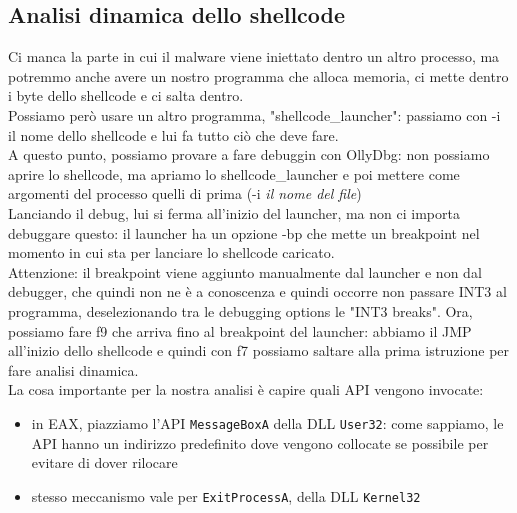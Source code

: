 \documentclass[12pt, oneside]{extbook}
\begin{document}
\subsection{Analisi dinamica dello shellcode}
Ci manca la parte in cui il malware viene iniettato dentro un altro processo, ma potremmo anche avere un nostro programma che alloca memoria, ci mette dentro i byte dello shellcode e ci salta dentro.\\Possiamo però usare un altro programma, "shellcode\_launcher": passiamo con -i il nome dello shellcode e lui fa tutto ciò che deve fare.\\A questo punto, possiamo provare a fare debuggin con OllyDbg: non possiamo aprire lo shellcode, ma apriamo lo shellcode\_launcher e poi mettere come argomenti del processo quelli di prima (-i \textit{il nome del file})\\Lanciando il debug, lui si ferma all'inizio del launcher, ma non ci importa debuggare questo: il launcher ha un opzione -bp che mette un breakpoint nel momento in cui sta per lanciare lo shellcode caricato.\\Attenzione: il breakpoint viene aggiunto manualmente dal launcher e non dal debugger, che quindi non ne è a conoscenza e quindi occorre non passare INT3 al programma, deselezionando tra le debugging options le "INT3 breaks". Ora, possiamo fare f9 che arriva fino al breakpoint del launcher: abbiamo il JMP all'inizio dello shellcode e quindi con f7 possiamo saltare alla prima istruzione per fare analisi dinamica.\\La cosa importante per la nostra analisi è capire quali API vengono invocate:
\begin{itemize}
	\item in EAX, piazziamo l'API \texttt{MessageBoxA} della DLL \texttt{User32}: come sappiamo, le API hanno un indirizzo predefinito dove vengono collocate se possibile per evitare di dover rilocare
	\item stesso meccanismo vale per \texttt{ExitProcessA}, della DLL \texttt{Kernel32}
\end{itemize}
\end{document}
